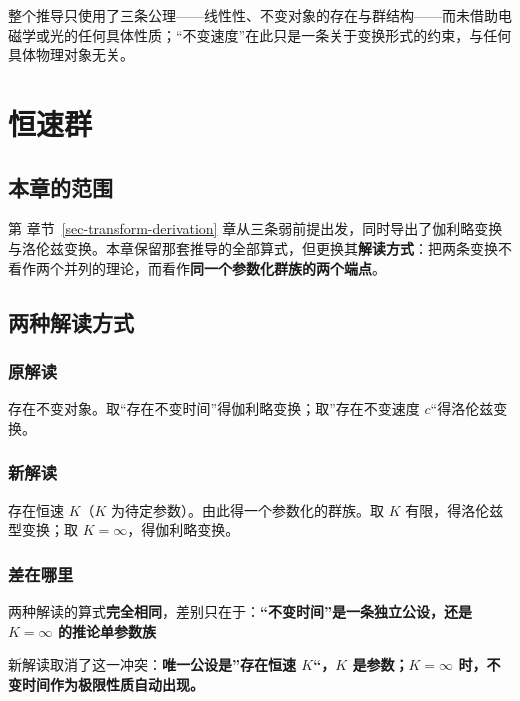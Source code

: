 \documentclass[
  chinese,
  a4paper,
  UTF8,
  12pt,
  oneside,
  openany]{ctexbook}
\theoremstyle{plain}
\theoremstyle{plain}
\theoremstyle{plain}
\theoremstyle{definition}
\theoremstyle{plain}
\theoremstyle{plain}
\theoremstyle{remark}
\begin{document}
整个推导只使用了三条公理------线性性、不变对象的存在与群结构------而未借助电磁学或光的任何具体性质；``不变速度''在此只是一条关于变换形式的约束，与任何具体物理对象无关。

\newpage


\chapter{恒速群}\label{sec-invariant-speed-group}

\section{本章的范围}\label{sec-isg-scope}

第 章节~\ref{sec-transform-derivation}
章从三条弱前提出发，同时导出了伽利略变换与洛伦兹变换。本章保留那套推导的全部算式，但更换其\textbf{解读方式}：把两条变换不看作两个并列的理论，而看作\textbf{同一个参数化群族的两个端点}。

\section{两种解读方式}\label{sec-isg-two-views}

\subsection{原解读}\label{ux539fux89e3ux8bfb}

存在不变对象。取``存在不变时间''得伽利略变换；取''存在不变速度
\(c\)``得洛伦兹变换。

\subsection{新解读}\label{ux65b0ux89e3ux8bfb}

存在恒速 \(K\)（\(K\) 为待定参数）。由此得一个参数化的群族。取 \(K\)
有限，得洛伦兹型变换；取 \(K=\infty\)，得伽利略变换。

\subsection{差在哪里}\label{ux5deeux5728ux54eaux91cc}

两种解读的算式\textbf{完全相同}，差别只在于：\textbf{``不变时间''是一条独立公设，还是
\(K=\infty\) 的推论单参数族}

新解读取消了这一冲突：\textbf{唯一公设是''存在恒速 \(K\)``，\(K\)
是参数；\(K=\infty\) 时，不变时间作为极限性质自动出现。}
\end{document}
